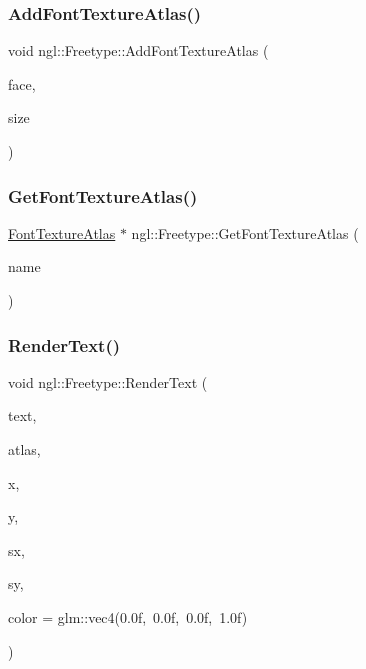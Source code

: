 \mbox{\label{classngl_1_1_freetype_a8758d36b4ca895fb3f98c38e40443ad6}} 
\subsubsection{\texorpdfstring{Add\+Font\+Texture\+Atlas()}{AddFontTextureAtlas()}}
{\footnotesize\ttfamily void ngl\+::\+Freetype\+::\+Add\+Font\+Texture\+Atlas (\begin{DoxyParamCaption}\item[{const std\+::string \&}]{face,  }\item[{unsigned int}]{size }\end{DoxyParamCaption})}

\mbox{\label{classngl_1_1_freetype_a8e740af5ce9a17c8b39482eb57b46fba}} 
\subsubsection{\texorpdfstring{Get\+Font\+Texture\+Atlas()}{GetFontTextureAtlas()}}
{\footnotesize\ttfamily \mbox{\hyperlink{classngl_1_1_font_texture_atlas}{Font\+Texture\+Atlas}} $\ast$ ngl\+::\+Freetype\+::\+Get\+Font\+Texture\+Atlas (\begin{DoxyParamCaption}\item[{const std\+::string \&}]{name }\end{DoxyParamCaption})}

\mbox{\label{classngl_1_1_freetype_aaf698f09e19fccd8ada0e50262b4ddf2}} 
\subsubsection{\texorpdfstring{Render\+Text()}{RenderText()}}
{\footnotesize\ttfamily void ngl\+::\+Freetype\+::\+Render\+Text (\begin{DoxyParamCaption}\item[{const char $\ast$}]{text,  }\item[{\mbox{\hyperlink{classngl_1_1_font_texture_atlas}{Font\+Texture\+Atlas}} $\ast$}]{atlas,  }\item[{float}]{x,  }\item[{float}]{y,  }\item[{float}]{sx,  }\item[{float}]{sy,  }\item[{const glm\+::vec4 \&}]{color = {\ttfamily glm\+:\+:vec4(0.0f,~0.0f,~0.0f,~1.0f)} }\end{DoxyParamCaption})}



